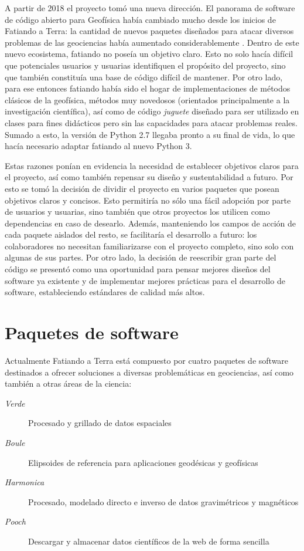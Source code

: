 A partir de 2018 el proyecto tomó una nueva dirección.
El panorama de software de código abierto para Geofísica había cambiado mucho
desde los inicios de Fatiando a Terra: la cantidad de nuevos paquetes diseñados
para atacar diversos problemas de las geociencias había aumentado
considerablemente
\citep{cockett2015, ruecker2017, varga2019, obspy2019}.
Dentro de este nuevo ecosistema, fatiando no poseía un objetivo claro.
Esto no solo hacía difícil que potenciales usuarios y usuarias identifiquen el
propósito del proyecto, sino que también constituía una base de código difícil
de mantener.
Por otro lado, para ese entonces fatiando había sido el hogar de
implementaciones de métodos clásicos de la geofísica, métodos muy novedosos
(orientados principalmente a la investigación científica), así como de código
\emph{juguete} diseñado para ser utilizado en clases para fines didácticos
pero sin las capacidades para atacar problemas reales.
Sumado a esto, la versión de Python 2.7 llegaba pronto a su final de vida, lo
que hacía necesario adaptar fatiando al nuevo Python 3.

Estas razones ponían en evidencia la necesidad de establecer objetivos claros
para el proyecto, así como también repensar su diseño y sustentabilidad
a futuro.
Por esto se tomó la decisión de dividir el proyecto en varios paquetes que
posean objetivos claros y concisos.
Esto permitiría no sólo una fácil adopción por parte de usuarios y usuarias,
sino también que otros proyectos los utilicen como dependencias en caso de
desearlo.
Además, manteniendo los campos de acción de cada paquete aislados del resto,
se facilitaría el desarrollo a futuro: los colaboradores no necesitan
familiarizarse con el proyecto completo, sino solo con algunas de sus partes.
Por otro lado, la decisión de reescribir gran parte del código se presentó como
una oportunidad para pensar mejores diseños del software ya existente y de
implementar mejores
prácticas para el desarrollo de software, estableciendo estándares de calidad
más altos.


\section{Paquetes de software}

Actualmente Fatiando a Terra está compuesto por cuatro paquetes de software
destinados a ofrecer soluciones a diversas problemáticas en geociencias, así
como también a otras áreas de la ciencia:

\begin{description}
    \item[\emph{Verde}]{%
        Procesado y grillado de datos espaciales
    }
    \item[\emph{Boule}]{%
        Elipsoides de referencia para aplicaciones geodésicas y geofísicas
    }
    \item[\emph{Harmonica}]{%
        Procesado, modelado directo e inverso de datos gravimétricos
        y magnéticos
    }
    \item[\emph{Pooch}]{%
        Descargar y almacenar datos científicos de la web de forma sencilla
    }
\end{description}


